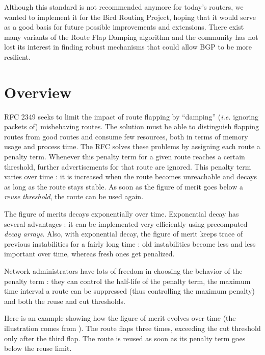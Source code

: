\documentclass[a4paper,english]{IEEEtran}
\begin{document}
Although this standard is not recommended anymore\cite{ripe recommendations}
for today's routers, we wanted to implement it for the Bird Routing
Project\cite{bird}, hoping that it would serve as a good basis for
future possible improvements and extensions. There exist
many variants of the Route Flap Damping algorithm and the community
has not lost its interest in finding robust mechanisms that could
allow BGP to be more resilient.


\section{Overview}

RFC 2349 seeks to limit the impact of route flapping by ``damping''
(\textit{i.e.} ignoring packets of) misbehaving routes. The solution
must be able to distinguish flapping routes from good routes and consume
few resources, both in terms of memory usage and process time. The
RFC solves these problems by assigning each route a penalty term.
Whenever this penalty term for a given route reaches a certain threshold,
further advertisements for that route are ignored. This penalty term
varies over time : it is increased when the route becomes unreachable
and decays as long as the route stays stable. As soon as the figure
of merit goes below a \textit{reuse threshold}, the route can be used
again.

The figure of merits decays exponentially over time. Exponential decay
has several advantages : it can be implemented very efficiently using
precomputed \textit{decay arrays}. Also, with exponential decay, the
figure of merit keeps trace of previous instabilities for a fairly
long time : old instabilities become less and less important over
time, whereas fresh ones get penalized.

Network administrators have lots of freedom in choosing the behavior
of the penalty term : they can control the half-life of the penalty
term, the maximum time interval a route can be suppressed (thus 
controlling the maximum penalty) and both the reuse and cut thresholds.

Here is an example showing how the figure of merit evolves over time
(the illustration comes from \cite{damping-pic}). The route flaps
three times, exceeding the cut threshold only after the third flap.
The route is reused as soon as its penalty term goes below the reuse
limit.
\end{document}
